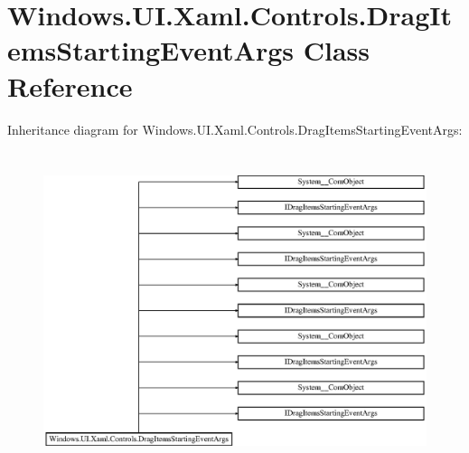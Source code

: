 \hypertarget{class_windows_1_1_u_i_1_1_xaml_1_1_controls_1_1_drag_items_starting_event_args}{}\section{Windows.\+U\+I.\+Xaml.\+Controls.\+Drag\+Items\+Starting\+Event\+Args Class Reference}
\label{class_windows_1_1_u_i_1_1_xaml_1_1_controls_1_1_drag_items_starting_event_args}
Inheritance diagram for Windows.\+U\+I.\+Xaml.\+Controls.\+Drag\+Items\+Starting\+Event\+Args\+:\begin{figure}[H]
\begin{center}
\leavevmode
\includegraphics[height=9.333334cm]{class_windows_1_1_u_i_1_1_xaml_1_1_controls_1_1_drag_items_starting_event_args}
\end{center}
\end{figure}
